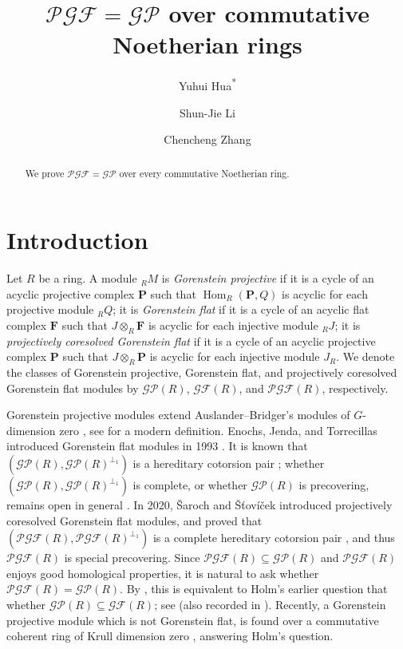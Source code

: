 \documentclass[11pt]{amsart}
\title{$\mathcal{PGF}=\mathcal{GP}$ over commutative Noetherian rings}
\author{Yuhui Hua\textsuperscript{*}}
\author{Shun-Jie Li}
\author{Chencheng Zhang}
\theoremstyle{remark}
\begin{document}
\begin{abstract}
We prove $\mathcal{PGF}=\mathcal{GP}$ over every commutative Noetherian ring.
\end{abstract}
\maketitle

\section{Introduction}

Let $R$ be a ring. 
A module ${}_RM$ is \emph{Gorenstein projective} if it is a cycle of an acyclic projective complex $\mathbf P$ such that $\operatorname{Hom}_R(\mathbf P,Q)$ is acyclic for each projective module ${}_RQ$; 
it is \emph{Gorenstein flat} if it is a cycle of an acyclic flat complex $\mathbf F$ such that $J\otimes_R\mathbf F$ is acyclic for each injective module ${}_RJ$; 
it is \emph{projectively coresolved Gorenstein flat} if it is a cycle of an acyclic projective complex $\mathbf P$ such that $J\otimes_R\mathbf P$ is acyclic for each injective module $J_R$. 
We denote the classes of Gorenstein projective, Gorenstein flat, and projectively coresolved Gorenstein flat modules by $\mathcal{GP}(R)$, $\mathcal{GF}(R)$, and $\mathcal{PGF}(R)$, respectively.

\medskip

Gorenstein projective modules extend Auslander--Bridger's modules of $G$-dimension zero \cite{AB}, see \cite{EJ} for a modern definition.
Enochs, Jenda, and Torrecillas introduced Gorenstein flat modules in 1993 \cite{EJT}. 
It is known that $(\mathcal{GP}(R),\mathcal{GP}(R)^{\perp_1})$ is a hereditary cotorsion pair \cite[Corollary~3.4(1)]{cortes-saroch};
whether $(\mathcal{GP}(R),\mathcal{GP}(R)^{\perp_1})$ is complete, or whether $\mathcal{GP}(R)$ is precovering, remains open in general \cite[Question~7.2]{cox}. 
In 2020, \v{S}aroch and \v{S}\v{t}ov\'{i}\v{c}ek introduced projectively coresolved Gorenstein flat modules,
and proved that $(\mathcal{PGF}(R),\mathcal{PGF}(R)^{\perp_1})$ is a complete hereditary cotorsion pair \cite[Theorem~4.9]{saroch-stovicek}, and thus $\mathcal{PGF}(R)$ is special precovering.
Since $\mathcal{PGF}(R)\subseteq\mathcal{GP}(R)$ and $\mathcal{PGF}(R)$ enjoys good homological properties, it is natural to ask whether $\mathcal{PGF}(R)=\mathcal{GP}(R)$.
By \cite{iacob,saroch-stovicek}, this is equivalent to Holm's earlier question that whether $\mathcal{GP}(R)\subseteq\mathcal{GF}(R)$; see \cite{holm-thesis} (also recorded in \cite[Remark~4.5(4)]{ding-li-mao}).
Recently, a Gorenstein projective module which is not Gorenstein flat, is found over a commutative coherent ring of Krull dimension zero \cite{zhang},
answering Holm's question.
\end{document}
